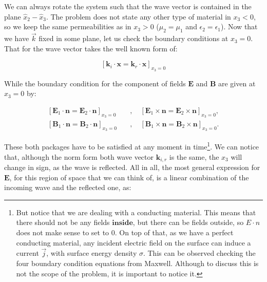 We can always rotate the system such that the wave vector is contained in the plane $\hat{x}_{2} - \hat{x}_{3}$. The problem does not state any other type of material in $x_{3} <0$, so we keep the same permeabilities as in $x_{3}>0$ ($\mu_{2} = \mu_{1}$ and $\epsilon_{2} = \epsilon_{1}$).   Now that we have $\vec{k}$ fixed in some plane, let us check the boundary conditions at $x_{3}=0$. That for the wave vector takes the well known form of:
	
\begin{equation}
	\left[\mathbf{k}_{i} \cdot \mathbf{x}=\mathbf{k}_{r} \cdot \mathbf{x}\right]_{x_{3}=0}
\end{equation}

While the boundary condition for the component of fields $\mathbf{E}$ and $\mathbf{B}$ are given at $x_{3} =0$ by:

\begin{equation}\label{eq:boundaryconditionsfields}
	\begin{split}
		\left[\mathbf{E}_{1} \cdot \mathbf{n}= \mathbf{E}_{2} \cdot \mathbf{n}\right]_{x_{3}=0} \quad&, \quad\left[\mathbf{E}_{1} \times \mathbf{n}=\mathbf{E}_{2} \times \mathbf{n}\right]_{x_{3}=0},\\
		\left[\mathbf{B}_{1} \cdot \mathbf{n}=\mathbf{B}_{2} \cdot \mathbf{n}\right]_{x_{3}=0} \quad&, \quad\left[ \mathbf{B}_{1} \times \mathbf{n}= \mathbf{B}_{2} \times \mathbf{n}\right]_{x_{3}=0}.
	\end{split}
\end{equation}
	
These both packages have to be satisfied at any moment in time\footnote{But notice that we are dealing with a conducting material. This means that there should not be any fields $\textbf{inside}$, but there can be fields outside, so $E\cdot n$ does not make sense to set to 0. On top of that, as we have a perfect conducting material, any incident electric field on the surface can induce a current $\vec{j}$, with surface energy density $\sigma$. This can be observed checking the four boundary condition equations from Maxwell. Although to discuss this is not the scope of the problem, it is important to notice it.}. We can notice that, although the norm form both wave vector $\mathbf{k}_{i,r}$ is the same, the $x_{3}$ will change in sign, as the wave is reflected. All in all, the most general expression for $\mathbf{E}$, for this region of space that we can think of, is a linear combination of the incoming wave and the reflected one, as:
	
